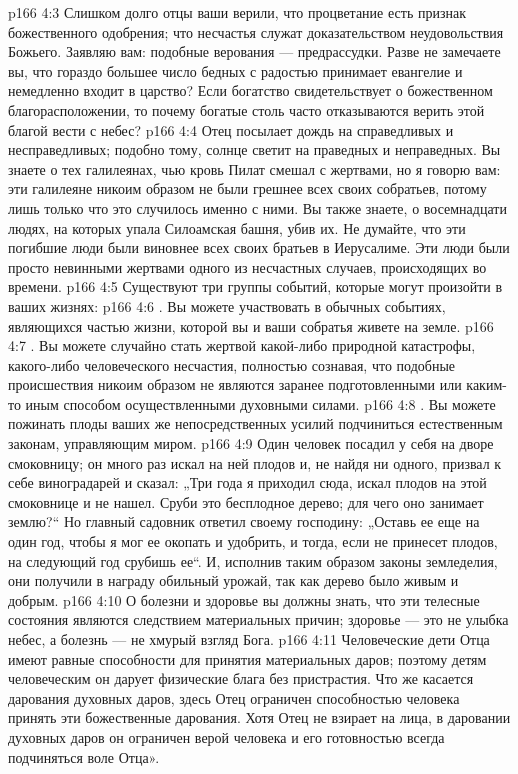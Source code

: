 \vs p166 4:3 Слишком долго отцы ваши верили, что процветание есть признак божественного одобрения; что несчастья служат доказательством неудовольствия Божьего. Заявляю вам: подобные верования --- предрассудки. Разве не замечаете вы, что гораздо большее число бедных с радостью принимает евангелие и немедленно входит в царство? Если богатство свидетельствует о божественном благорасположении, то почему богатые столь часто отказываются верить этой благой вести с небес?
\vs p166 4:4 Отец посылает дождь на справедливых и несправедливых; подобно тому, солнце светит на праведных и неправедных. Вы знаете о тех галилеянах, чью кровь Пилат смешал с жертвами, но я говорю вам: эти галилеяне никоим образом не были грешнее всех своих собратьев, потому лишь только что это случилось именно с ними. Вы также знаете, о восемнадцати людях, на которых упала Силоамская башня, убив их. Не думайте, что эти погибшие люди были виновнее всех своих братьев в Иерусалиме. Эти люди были просто невинными жертвами одного из несчастных случаев, происходящих во времени.
\vs p166 4:5 Существуют три группы событий, которые могут произойти в ваших жизнях:
\vs p166 4:6 . Вы можете участвовать в обычных событиях, являющихся частью жизни, которой вы и ваши собратья живете на земле.
\vs p166 4:7 . Вы можете случайно стать жертвой какой\hyp{}либо природной катастрофы, какого\hyp{}либо человеческого несчастия, полностью сознавая, что подобные происшествия никоим образом не являются заранее подготовленными или каким\hyp{}то иным способом осуществленными духовными силами.
\vs p166 4:8 . Вы можете пожинать плоды ваших же непосредственных усилий подчиниться естественным законам, управляющим миром.
\vs p166 4:9 \pc Один человек посадил у себя на дворе смоковницу; он много раз искал на ней плодов и, не найдя ни одного, призвал к себе виноградарей и сказал: „Три года я приходил сюда, искал плодов на этой смоковнице и не нашел. Сруби это бесплодное дерево; для чего оно занимает землю?“ Но главный садовник ответил своему господину: „Оставь ее еще на один год, чтобы я мог ее окопать и удобрить, и тогда, если не принесет плодов, на следующий год срубишь ее“. И, исполнив таким образом законы земледелия, они получили в награду обильный урожай, так как дерево было живым и добрым.
\vs p166 4:10 О болезни и здоровье вы должны знать, что эти телесные состояния являются следствием материальных причин; здоровье --- это не улыбка небес, а болезнь --- не хмурый взгляд Бога.
\vs p166 4:11 Человеческие дети Отца имеют равные способности для принятия материальных даров; поэтому детям человеческим он дарует физические блага без пристрастия. Что же касается дарования духовных даров, здесь Отец ограничен способностью человека принять эти божественные дарования. Хотя Отец не взирает на лица, в даровании духовных даров он ограничен верой человека и его готовностью всегда подчиняться воле Отца».
